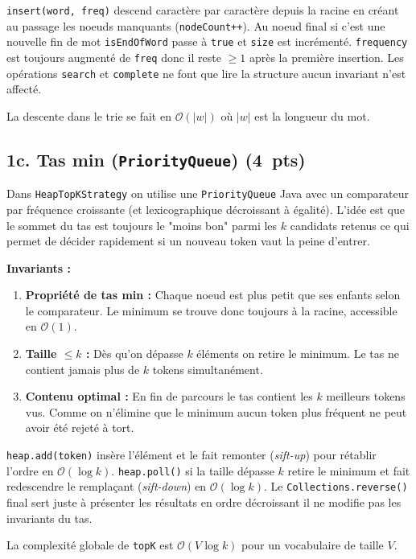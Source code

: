 \documentclass[12pt,a4paper]{article}
\newcommand{\jclass}[1]{\texttt{#1}}
\newcommand{\pts}[1]{\hfill\textbf{\small(#1~pts)}}
\newcommand{\bigo}[1]{$\mathcal{O}(#1)$}
\begin{document}
\texttt{insert(word, freq)} descend caractère par caractère depuis la racine en créant
au passage les noeuds manquants (\texttt{nodeCount++}). Au noeud final si c'est une nouvelle
fin de mot \texttt{isEndOfWord} passe à \texttt{true} et \texttt{size} est incrémenté.
\texttt{frequency} est toujours augmenté de \texttt{freq} donc il reste $\geq 1$ après la
première insertion. Les opérations \texttt{search} et \texttt{complete} ne font que lire
la structure aucun invariant n'est affecté.

La descente dans le trie se fait en \bigo{|w|} où $|w|$ est la longueur du mot.

\subsection*{1c. Tas min (\jclass{PriorityQueue}) \pts{4}}

Dans \jclass{HeapTopKStrategy} on utilise une \jclass{PriorityQueue} Java avec un
comparateur par fréquence croissante (et lexicographique décroissant à égalité). L'idée
est que le sommet du tas est toujours le  "moins bon" parmi les $k$ candidats retenus
ce qui permet de décider rapidement si un nouveau token vaut la peine d'entrer.

\textbf{Invariants :}
\begin{enumerate}
  \item \textbf{Propriété de tas min :} Chaque noeud est plus petit que ses enfants selon
        le comparateur. Le minimum se trouve donc toujours à la racine, accessible en \bigo{1}.
  \item \textbf{Taille $\leq k$ :} Dès qu'on dépasse $k$ éléments on retire le minimum.
        Le tas ne contient jamais plus de $k$ tokens simultanément.
  \item \textbf{Contenu optimal :} En fin de parcours le tas contient les $k$ meilleurs
        tokens vus. Comme on n'élimine que le minimum aucun token plus fréquent ne peut
        avoir été rejeté à tort.
\end{enumerate}

\texttt{heap.add(token)} insère l'élément et le fait remonter (\emph{sift-up}) pour rétablir
l'ordre en \bigo{\log k}. \texttt{heap.poll()} si la taille dépasse $k$ retire le minimum
et fait redescendre le remplaçant (\emph{sift-down}) en \bigo{\log k}. Le
\texttt{Collections.reverse()} final sert juste à présenter les résultats en ordre
décroissant il ne modifie pas les invariants du tas.

La complexité globale de \texttt{topK} est \bigo{V \log k} pour un vocabulaire de taille $V$.
\end{document}
